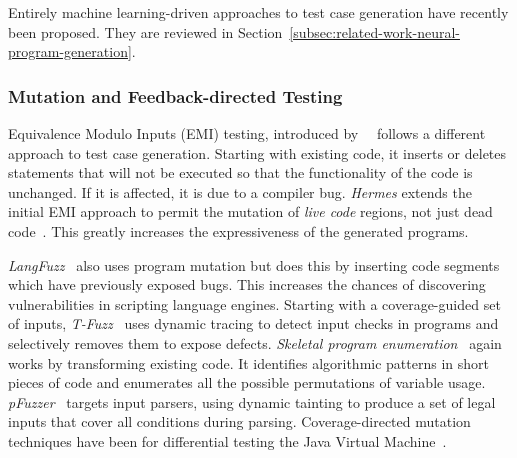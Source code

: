 Entirely machine learning-driven approaches to test case generation have recently been proposed. They are reviewed in Section~\ref{subsec:related-work-neural-program-generation}.


\subsubsection{Mutation and Feedback-directed Testing}

Equivalence Modulo Inputs (EMI) testing, introduced by~\citeauthor{Le2013a}~\cite{Le2013a} follows a different approach to test case generation. Starting with existing code, it inserts or deletes statements that will not be executed so that the functionality of the code is unchanged. If it is affected, it is due to a compiler bug. \emph{Hermes} extends the initial EMI approach to permit the mutation of \emph{live code} regions, not just dead code~\cite{Sun2016a}. This greatly increases the expressiveness of the generated programs.

\emph{LangFuzz}~\cite{Holler2012} also uses program mutation but does this by inserting code segments which have previously exposed bugs. This increases the chances of discovering vulnerabilities in scripting language engines.
Starting with a coverage-guided set of inputs, \emph{T-Fuzz}~\cite{Peng2018} uses dynamic tracing to detect input checks in programs and selectively removes them to expose defects.
\emph{Skeletal program enumeration}~\cite{Zhang2017a} again works by transforming existing code. It identifies algorithmic patterns in short pieces of code and enumerates all the possible permutations of variable usage.
\emph{pFuzzer}~\cite{Mathis2019} targets input parsers, using dynamic tainting to produce a set of legal inputs that cover all conditions during parsing.
Coverage-directed mutation techniques have been for differential testing the Java Virtual Machine~\cite{Chen2016b}.


